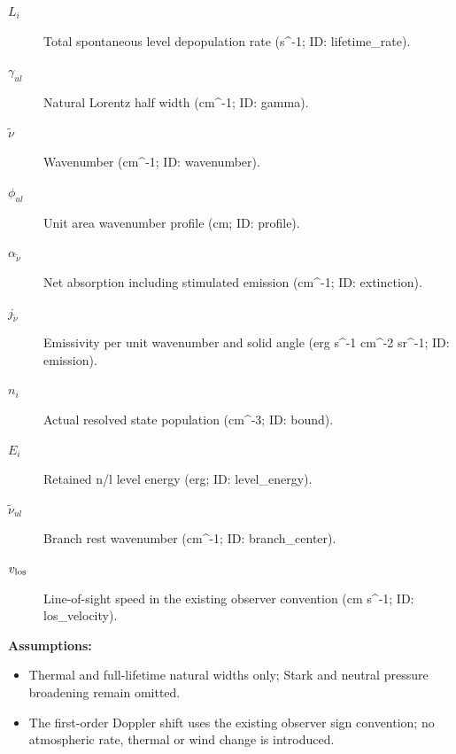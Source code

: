 \begin{description}
\item[$L_i$] Total spontaneous level depopulation rate (s\textasciicircum{}-1; ID: lifetime\_rate).
\item[$\gamma_{ul}$] Natural Lorentz half width (cm\textasciicircum{}-1; ID: gamma).
\item[$\widetilde\nu$] Wavenumber (cm\textasciicircum{}-1; ID: wavenumber).
\item[$\phi_{ul}$] Unit area wavenumber profile (cm; ID: profile).
\item[$\alpha_{\widetilde\nu}$] Net absorption including stimulated emission (cm\textasciicircum{}-1; ID: extinction).
\item[$j_{\widetilde\nu}$] Emissivity per unit wavenumber and solid angle (erg s\textasciicircum{}-1 cm\textasciicircum{}-2 sr\textasciicircum{}-1; ID: emission).
\item[$n_i$] Actual resolved state population (cm\textasciicircum{}-3; ID: bound).
\item[$E_i$] Retained n/l level energy (erg; ID: level\_energy).
\item[$\widetilde\nu_{ul}$] Branch rest wavenumber (cm\textasciicircum{}-1; ID: branch\_center).
\item[$v_{\rm los}$] Line-of-sight speed in the existing observer convention (cm s\textasciicircum{}-1; ID: los\_velocity).
\end{description}

\noindent\textbf{Assumptions:}
\begin{itemize}
\item Thermal and full-lifetime natural widths only; Stark and neutral pressure broadening remain omitted.
\item The first-order Doppler shift uses the existing observer sign convention; no atmospheric rate, thermal or wind change is introduced.
\end{itemize}
